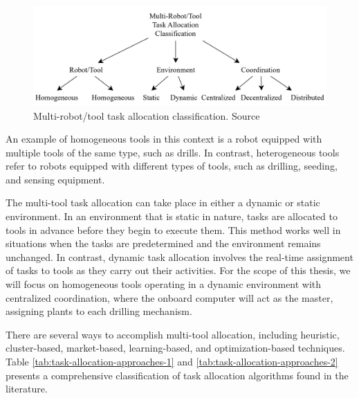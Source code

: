 \begin{figure}[bth]
    \centering
    \includegraphics[width=0.9\linewidth]{gfx/introduction/task-allocation-classification.png}
    \caption{Multi-robot/tool task allocation classification. Source \cite{10.1145/3700591}}
    \label{fig:task-allocation-classification}
\end{figure}

An example of homogeneous tools in this context is a robot equipped with multiple tools of the same type, such as drills. In contrast, heterogeneous tools refer to robots equipped with different types of tools, such as drilling, seeding, and sensing equipment.

The multi-tool task allocation can take place in either a dynamic or static environment. In an environment that is static in nature, tasks are allocated to tools in advance before they begin to execute them. This method works well in situations when the tasks are predetermined and the environment remains unchanged. In contrast, dynamic task allocation involves the real-time assignment of tasks to tools as they carry out their activities. For the scope of this thesis, we will focus on homogeneous tools operating in a dynamic environment with centralized coordination, where the onboard computer will act as the master, assigning plants to each drilling mechanism.

There are several ways to accomplish multi-tool allocation, including heuristic, cluster-based, market-based, learning-based, and optimization-based techniques. Table \ref{tab:task-allocation-approaches-1} and \ref{tab:task-allocation-approaches-2} presents a comprehensive classification of task allocation algorithms found in the literature.

